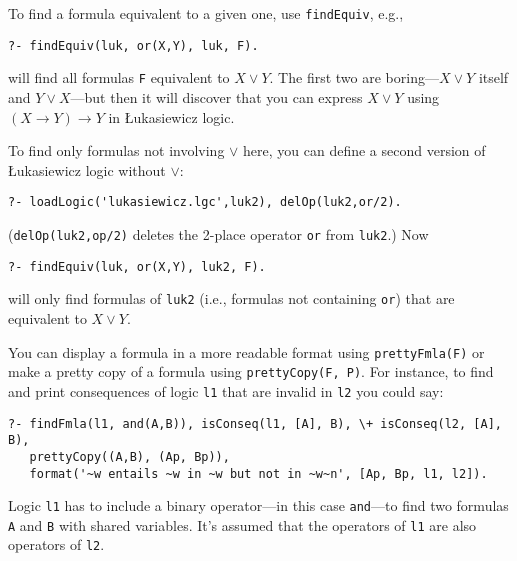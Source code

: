 \documentclass[
]{article}
\newcommand{\passthrough}[1]{#1}
\begin{document}
To find a formula equivalent to a given one, use
\passthrough{\lstinline!findEquiv!}, e.g.,

\begin{lstlisting}
?- findEquiv(luk, or(X,Y), luk, F).
\end{lstlisting}

will find all formulas \passthrough{\lstinline!F!} equivalent to
\(X \lor Y\). The first two are boring---\(X \lor Y\) itself and
\(Y \lor X\)---but then it will discover that you can express
\(X \lor Y\) using \((X \to Y) \to Y\) in Łukasiewicz logic.

To find only formulas not involving \(\lor\) here, you can define a
second version of Łukasiewicz logic without \(\lor\):

\begin{lstlisting}
?- loadLogic('lukasiewicz.lgc',luk2), delOp(luk2,or/2).
\end{lstlisting}

(\passthrough{\lstinline!delOp(luk2,op/2)!} deletes the 2-place operator
\passthrough{\lstinline!or!} from \passthrough{\lstinline!luk2!}.) Now

\begin{lstlisting}
?- findEquiv(luk, or(X,Y), luk2, F).
\end{lstlisting}

will only find formulas of \passthrough{\lstinline!luk2!} (i.e.,
formulas not containing \passthrough{\lstinline!or!}) that are
equivalent to \(X \lor Y\).

You can display a formula in a more readable format using
\passthrough{\lstinline!prettyFmla(F)!} or make a pretty copy of a
formula using \passthrough{\lstinline!prettyCopy(F, P)!}. For instance,
to find and print consequences of logic \passthrough{\lstinline!l1!}
that are invalid in \passthrough{\lstinline!l2!} you could say:

\begin{lstlisting}
?- findFmla(l1, and(A,B)), isConseq(l1, [A], B), \+ isConseq(l2, [A], B),
   prettyCopy((A,B), (Ap, Bp)),
   format('~w entails ~w in ~w but not in ~w~n', [Ap, Bp, l1, l2]).
\end{lstlisting}

Logic \passthrough{\lstinline!l1!} has to include a binary operator---in
this case \passthrough{\lstinline!and!}---to find two formulas
\passthrough{\lstinline!A!} and \passthrough{\lstinline!B!} with shared
variables. It's assumed that the operators of
\passthrough{\lstinline!l1!} are also operators of
\passthrough{\lstinline!l2!}.
\end{document}
